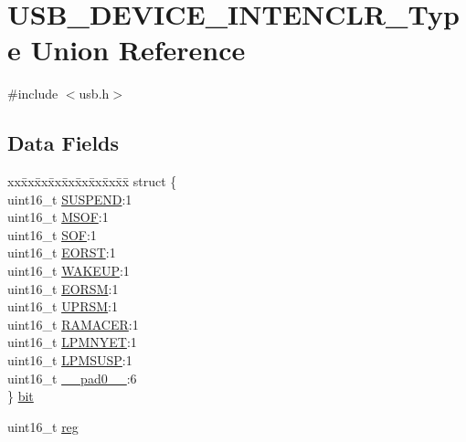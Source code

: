 \hypertarget{union_u_s_b___d_e_v_i_c_e___i_n_t_e_n_c_l_r___type}{}\section{U\+S\+B\+\_\+\+D\+E\+V\+I\+C\+E\+\_\+\+I\+N\+T\+E\+N\+C\+L\+R\+\_\+\+Type Union Reference}
\label{union_u_s_b___d_e_v_i_c_e___i_n_t_e_n_c_l_r___type}


{\ttfamily \#include $<$usb.\+h$>$}

\subsection*{Data Fields}
\begin{DoxyCompactItemize}
\item 
\begin{tabbing}
xx\=xx\=xx\=xx\=xx\=xx\=xx\=xx\=xx\=\kill
struct \{\\
\>uint16\_t \mbox{\hyperlink{union_u_s_b___d_e_v_i_c_e___i_n_t_e_n_c_l_r___type_a26ef1067b52043f3d704c791d59dfb72}{SUSPEND}}:1\\
\>uint16\_t \mbox{\hyperlink{union_u_s_b___d_e_v_i_c_e___i_n_t_e_n_c_l_r___type_a21f55e475a4e07c45c411a1114edee22}{MSOF}}:1\\
\>uint16\_t \mbox{\hyperlink{union_u_s_b___d_e_v_i_c_e___i_n_t_e_n_c_l_r___type_a33a02010418ddf6b626c6b60c38b6eef}{SOF}}:1\\
\>uint16\_t \mbox{\hyperlink{union_u_s_b___d_e_v_i_c_e___i_n_t_e_n_c_l_r___type_ad93b1a5ffc2f26c7ec1e53bacee026ab}{EORST}}:1\\
\>uint16\_t \mbox{\hyperlink{union_u_s_b___d_e_v_i_c_e___i_n_t_e_n_c_l_r___type_a8daebdfb4a00acfdbe16023d636e3887}{WAKEUP}}:1\\
\>uint16\_t \mbox{\hyperlink{union_u_s_b___d_e_v_i_c_e___i_n_t_e_n_c_l_r___type_a61ae5e49cbf62ef2b52ef49a19d9e5b5}{EORSM}}:1\\
\>uint16\_t \mbox{\hyperlink{union_u_s_b___d_e_v_i_c_e___i_n_t_e_n_c_l_r___type_a21d16bc73d976e53f035b7dd20e1160b}{UPRSM}}:1\\
\>uint16\_t \mbox{\hyperlink{union_u_s_b___d_e_v_i_c_e___i_n_t_e_n_c_l_r___type_a0391330e7e210b908b26fec3fe07622f}{RAMACER}}:1\\
\>uint16\_t \mbox{\hyperlink{union_u_s_b___d_e_v_i_c_e___i_n_t_e_n_c_l_r___type_a31103e6ae71b4b0a2c6f4e04bc791f9a}{LPMNYET}}:1\\
\>uint16\_t \mbox{\hyperlink{union_u_s_b___d_e_v_i_c_e___i_n_t_e_n_c_l_r___type_a7daf027f24967e7b249ddb5179211ec9}{LPMSUSP}}:1\\
\>uint16\_t \mbox{\hyperlink{union_u_s_b___d_e_v_i_c_e___i_n_t_e_n_c_l_r___type_a77132c2c26a75f5b8751b235cda23828}{\_\_pad0\_\_}}:6\\
\} \mbox{\hyperlink{union_u_s_b___d_e_v_i_c_e___i_n_t_e_n_c_l_r___type_a054aa6455f742cdc6a45907c1272bae1}{bit}}\\

\end{tabbing}\item 
uint16\+\_\+t \mbox{\hyperlink{union_u_s_b___d_e_v_i_c_e___i_n_t_e_n_c_l_r___type_a11760f5020019f4aa8cb02e694f7cc44}{reg}}
\end{DoxyCompactItemize}


